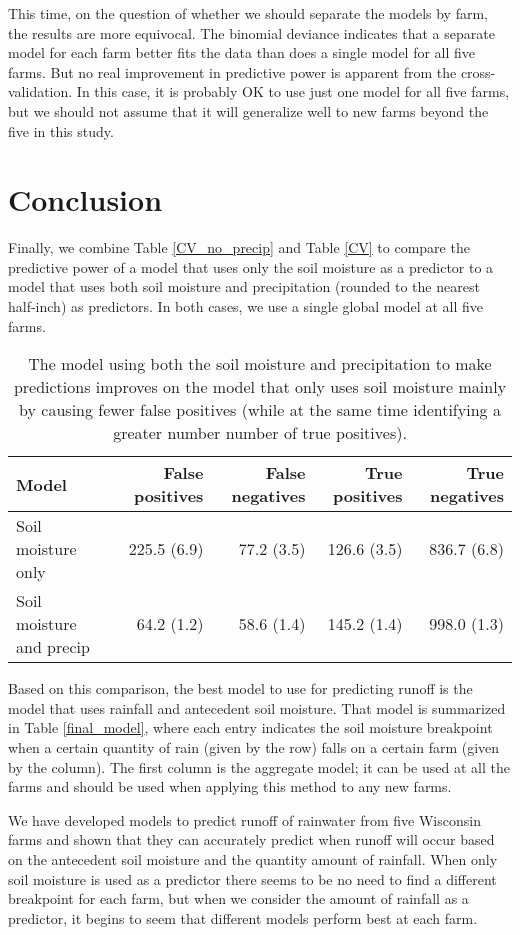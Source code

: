 \documentclass[11pt]{article}
\begin{document}
This time, on the question of whether we should separate the models by farm, the results are more equivocal. The binomial deviance indicates that a separate model for each farm better fits the data than does a single model for all five farms. But no real improvement in predictive power is apparent from the cross-validation. In this case, it is probably OK to use just one model for all five farms, but we should not assume that it will generalize well to new farms beyond the five in this study.\*


\section{Conclusion}
Finally, we combine Table \ref{CV_no_precip} and Table \ref{CV} to compare the predictive power of a model that uses only the soil moisture as a predictor to a model that uses both soil moisture and precipitation (rounded to the nearest half-inch) as predictors. In both cases, we use a single global model at all five farms. \*

\begin{table}[h!]
\centering
	\linespread{1}
	\begin{tabular}{l r r r r}
		Model & False positives & False negatives & True positives & True negatives \\
		\hline 
		Soil moisture only & 225.5 (6.9) & 77.2 (3.5) & 126.6 (3.5) & 836.7 (6.8) \\
		Soil moisture and precip & 64.2 (1.2) & 58.6 (1.4) & 145.2 (1.4) & 998.0 (1.3) \\
	\end{tabular}
	\caption{The model using both the soil moisture and precipitation to make predictions improves on the model that only uses soil moisture mainly by causing fewer false positives (while at the same time identifying a greater number number of true positives). \label{prediction}}
	\linespread{2}
\end{table}

Based on this comparison, the best model to use for predicting runoff is the model that uses rainfall and antecedent soil moisture. That model is summarized in Table \ref{final_model}, where each entry indicates the soil moisture breakpoint when a certain quantity of rain (given by the row) falls on a certain farm (given by the column). The first column is the aggregate model; it can be used at all the farms and should be used when applying this method to any new farms.\*

We have developed models to predict runoff of rainwater from five Wisconsin farms and shown that they can accurately predict when runoff will occur based on the antecedent soil moisture and the quantity amount of rainfall. When only soil moisture is used as a predictor there seems to be no need to find a different breakpoint for each farm, but when we consider the amount of rainfall as a predictor, it begins to seem that different models perform best at each farm.\*
\end{document}
